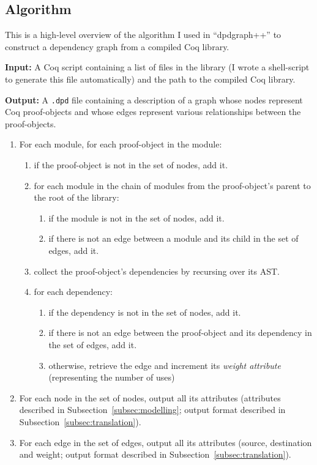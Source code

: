 \subsection{Algorithm}

This is a high-level overview of the algorithm I used in ``dpdgraph++'' to
construct a dependency graph from a compiled Coq library.

\textbf{Input:} A Coq script containing a list of files in the library (I wrote
a shell-script to generate this file automatically) and the path to the compiled
Coq library.

\textbf{Output:} A \texttt{.dpd} file containing a description of a graph whose
nodes represent Coq proof-objects and whose edges represent various
relationships between the proof-objects.

\begin{enumerate}

  \item For each module, for each proof-object in the module:

    \begin{enumerate}
      \item if the proof-object is not in the set of nodes, add it.
      \item for each module in the chain of modules from the proof-object's parent
        to the root of the library: 
        \begin{enumerate}
          \item if the module is not in the set of nodes, add it.
          \item if there is not an edge between a module and its child in the
            set of edges, add it.
        \end{enumerate}
      \item collect the proof-object's dependencies by recursing over its AST.
      \item for each dependency: 
        \begin{enumerate} 
          \item if the dependency is not in the set of nodes, add it.
          \item if there is not an edge between the proof-object and its
            dependency in the set of edges, add it.
          \item otherwise, retrieve the edge and increment its \emph{weight
            attribute} (representing the number of uses)
        \end{enumerate}
    \end{enumerate}
  
  \item For each node in the set of nodes, output all its attributes
    (attributes described in Subsection~\ref{subsec:modelling}; output format described in
    Subsection~\ref{subsec:translation}).

  \item For each edge in the set of edges, output all its attributes (source,
    destination and weight; output format described in
    Subsection~\ref{subsec:translation}).

\end{enumerate}

